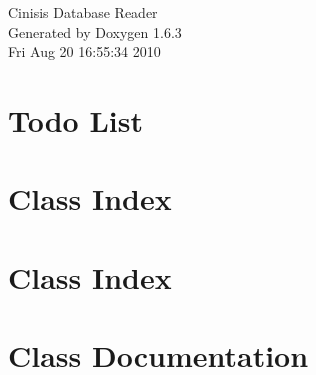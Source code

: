 \documentclass[a4paper]{book}
\begin{document}
\hypersetup{pageanchor=false}
\begin{titlepage}
\vspace*{7cm}
\begin{center}
{\Large Cinisis Database Reader }\\
\vspace*{1cm}
{\large Generated by Doxygen 1.6.3}\\
\vspace*{0.5cm}
{\small Fri Aug 20 16:55:34 2010}\\
\end{center}
\end{titlepage}
\clearemptydoublepage
{}
\tableofcontents
\clearemptydoublepage
{}
\hypersetup{pageanchor=true}
\chapter{Todo List}
\label{todo}
\hypertarget{todo}{}

\chapter{Class Index}

\chapter{Class Index}

\chapter{Class Documentation}





















\printindex
\end{document}

